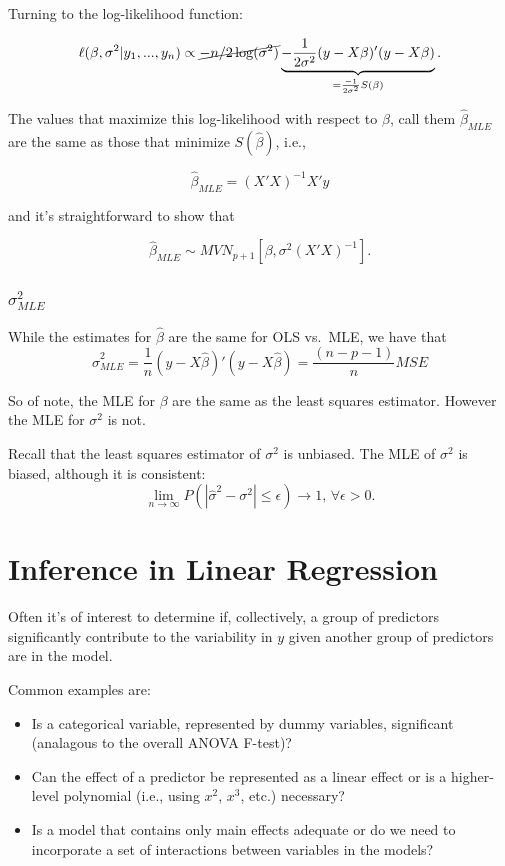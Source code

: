 \documentclass[
  letterpaper,
  DIV=11,
  numbers=noendperiod]{scrreport}
\providecommand{\tightlist}{%
  \setlength{\itemsep}{0pt}\setlength{\parskip}{0pt}}\usepackage{longtable,booktabs,array}
\begin{document}
Turning to the log-likelihood function:

\[\ell(\beta, \sigma^2 | y_1, ..., y_n) \propto \cancel{-n/2\log(\sigma^2)} \underbrace{- \frac{1}{2\sigma^2} (y-X\beta)'(y-X\beta)}_{= \frac{-1}{2\sigma^2} S(\beta)}.\]

The values that maximize this log-likelihood with respect to \(\beta\),
call them \(\hat \beta_{MLE}\) are the same as those that minimize
\(S(\hat \beta)\), i.e.,

\[\hat \beta_{MLE} = (X'X)^{-1}X'y\]

and it's straightforward to show that

\[\hat \beta_{MLE} \sim MVN_{p+1}\left[ \beta, \sigma^2(X'X)^{-1} \right].\]

\hypertarget{sigma2_mle}{%
\subsubsection{\texorpdfstring{\(\sigma^2_{MLE}\)}{\textbackslash sigma\^{}2\_\{MLE\}}}\label{sigma2_mle}}

While the estimates for \(\hat \beta\) are the same for OLS vs.~MLE, we
have that
\[\hat \sigma^2_{MLE} = \frac{1}{n}(y-X\hat\beta)'(y-X\hat\beta) = \frac{(n-p-1)}{n}MSE\]

So of note, the MLE for \(\beta\) are the same as the least squares
estimator. However the MLE for \(\sigma^2\) is not.

Recall that the least squares estimator of \(\sigma^2\) is unbiased. The
MLE of \(\sigma^2\) is biased, although it is consistent:
\[\lim_{n\to\infty} P(|\hat\sigma^2 - \sigma^2| \leq \epsilon) \to 1, \, \forall \epsilon > 0.\]

\hypertarget{inference-in-linear-regression}{%
\section{Inference in Linear
Regression}\label{inference-in-linear-regression}}

Often it's of interest to determine if, collectively, a group of
predictors significantly contribute to the variability in \(y\) given
another group of predictors are in the model.

Common examples are:

\begin{itemize}
\tightlist
\item
  Is a categorical variable, represented by dummy variables, significant
  (analagous to the overall ANOVA F-test)?
\item
  Can the effect of a predictor be represented as a linear effect or is
  a higher-level polynomial (i.e., using \(x^2\), \(x^3\), etc.)
  necessary?
\item
  Is a model that contains only main effects adequate or do we need to
  incorporate a set of interactions between variables in the models?
\end{itemize}
\end{document}
